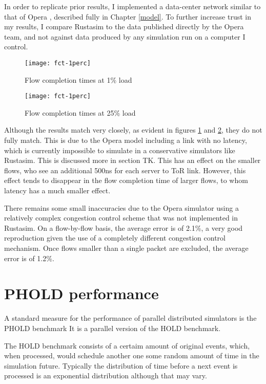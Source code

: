 In order to replicate prior results, I implemented a data-center network similar to that of Opera \opera, described fully in Chapter \ref{model}. %
To further increase trust in my results, I compare Rustasim to the data published directly by the Opera team, and not against data produced by any simulation run on a computer I control.

\begin{figure}[h]
    \centering
    \texttt{[image: fct-1perc]}
    \caption{
        Flow completion times at 1\% load
    }
    \label{fct-1perc}
\end{figure}

\begin{figure}[h]
    \centering
    \texttt{[image: fct-1perc]}
    \caption{
        Flow completion times at 25\% load
    }
    \label{fct-25perc}
\end{figure}

Although the results match very closely, as evident in figures \ref{fct-1perc} and \ref{fct-25perc}, they do not fully match.
This is due to the Opera model including a link with no latency, which is currently impossible to simulate in a conservative simulators like Rustasim.
This is discussed more in section TK. %
This has an effect on the smaller flows, who see an additional 500ns for each server to ToR link.
However, this effect tends to disappear in the flow completion time of larger flows, to whom latency has a much smaller effect.

There remains some small inaccuracies due to the Opera simulator using a relatively complex congestion control scheme that was not implemented in Rustasim.
On a flow-by-flow basis, the average error is of 2.1\%, a very good reproduction given the use of a completely different congestion control mechanism.
Once flows smaller than a single packet are excluded, the average error is of 1.2\%.


\section{PHOLD performance} \label{phold}

A standard measure for the performance of parallel distributed simulators is the PHOLD benchmark %
It is a parallel version of the HOLD benchmark. %

The HOLD benchmark consists of a certaim amount of original events, which, when processed, would schedule another one some random amount of time in the simulation future.
Typically the distribution of time before a next event is processed is an exponential distribution although that may vary.

